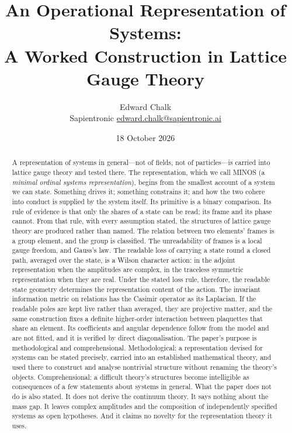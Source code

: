 \documentclass[11pt,a4paper]{article}
\title{An Operational Representation of Systems:\\ A Worked Construction in Lattice Gauge Theory}
\author{Edward Chalk\\ \small Sapientronic \quad \href{mailto:edward.chalk@sapientronic.ai}{edward.chalk@sapientronic.ai}}
\date{18 October 2026}
\theoremstyle{plain}
\theoremstyle{definition}
\theoremstyle{remark}
\begin{document}
\maketitle

\begin{abstract}
A representation of systems in general---not of fields, not of particles---is carried into lattice gauge theory and tested there. The representation, which we call MINOS (a \emph{minimal ordinal systems representation}), begins from the smallest account of a system we can state. Something drives it; something constrains it; and how the two cohere into conduct is supplied by the system itself. Its primitive is a binary comparison. Its rule of evidence is that only the shares of a state can be read; its frame and its phase cannot. From that rule, with every assumption stated, the structures of lattice gauge theory are produced rather than named. The relation between two elements' frames is a group element, and the group is classified. The unreadability of frames is a local gauge freedom, and Gauss's law. The readable loss of carrying a state round a closed path, averaged over the state, is a Wilson character action: in the adjoint representation when the amplitudes are complex, in the traceless symmetric representation when they are real. Under the stated loss rule, therefore, the readable state geometry determines the representation content of the action. The invariant information metric on relations has the Casimir operator as its Laplacian. If the readable poles are kept live rather than averaged, they are projective matter, and the same construction fixes a definite higher-order interaction between plaquettes that share an element. Its coefficients and angular dependence follow from the model and are not fitted, and it is verified by direct diagonalisation. The paper's purpose is methodological and comprehensional. Methodological: a representation devised for systems can be stated precisely, carried into an established mathematical theory, and used there to construct and analyse nontrivial structure without renaming the theory's objects. Comprehensional: a difficult theory's structures become intelligible as consequences of a few statements about systems in general. What the paper does not do is also stated. It does not derive the continuum theory. It says nothing about the mass gap. It leaves complex amplitudes and the composition of independently specified systems as open hypotheses. And it claims no novelty for the representation theory it uses.
\end{abstract}
\end{document}

